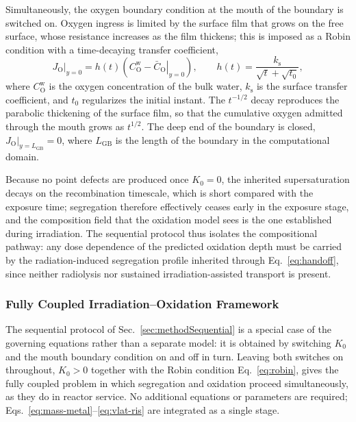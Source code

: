 \documentclass[3p,times]{elsarticle} %
\newcommand{\GB}{\mathrm{GB}}
\newcommand{\Ox}{\mathrm{O}}           %
\begin{document}
Simultaneously, the oxygen boundary condition at the mouth of the boundary is switched
on. Oxygen ingress is limited by the surface film that grows on the free surface, whose
resistance increases as the film thickens; this is imposed as a Robin condition with a
time-decaying transfer coefficient,
\begin{equation}
\left.J_{\Ox}\right|_{y=0}
= h(t)\left(C_{\Ox}^{\mathrm{w}}-\left.\bar{C}_{\Ox}\right|_{y=0}\right),
\qquad
h(t)=\frac{k_{\mathrm{s}}}{\sqrt{t}+\sqrt{t_0}} ,
\label{eq:robin}
\end{equation}
where \(C_{\Ox}^{\mathrm{w}}\) is the oxygen concentration of the bulk water,
\(k_{\mathrm{s}}\) is the surface transfer coefficient, and \(t_0\) regularizes the
initial instant. The \(t^{-1/2}\) decay reproduces the parabolic thickening of the
surface film, so that the cumulative oxygen admitted through the mouth grows as
\(t^{1/2}\). The deep end of the boundary is closed,
\(\left.J_{\Ox}\right|_{y=L_{\GB}}=0\), where \(L_{\GB}\) is the length of
the boundary in the computational domain.

Because no point defects are produced once \(K_0=0\), the inherited supersaturation
decays on the recombination timescale, which is short compared with the exposure time;
segregation therefore effectively ceases early in the exposure stage, and the
composition field that the oxidation model sees is the one established during
irradiation. The sequential protocol thus isolates the compositional pathway: any dose
dependence of the predicted oxidation depth must be carried by the radiation-induced
segregation profile inherited through Eq.~\eqref{eq:handoff}, since neither radiolysis
nor sustained irradiation-assisted transport is present.

\subsubsection{Fully Coupled Irradiation--Oxidation Framework}
\label{sec:methodFullyCoupled}

The sequential protocol of Sec.~\ref{sec:methodSequential} is a special case of the
governing equations rather than a separate model: it is obtained by switching \(K_0\)
and the mouth boundary condition on and off in turn. Leaving both switches on
throughout, \(K_0>0\) together with the Robin condition Eq.~\eqref{eq:robin}, gives the
fully coupled problem in which segregation and oxidation proceed simultaneously, as
they do in reactor service. No additional equations or parameters are required;
Eqs.~\eqref{eq:mass-metal}--\eqref{eq:vlat-ris} are integrated as a single stage.
\end{document}
